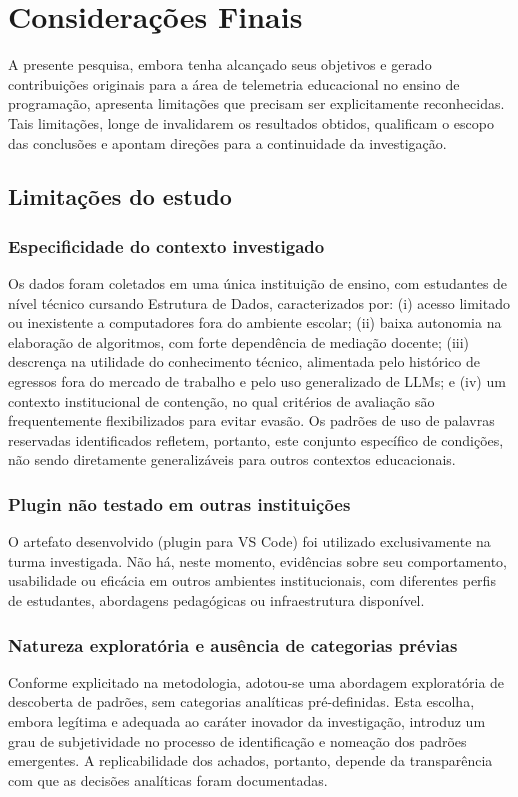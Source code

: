 \chapter{Considerações Finais}
\label{cap-consideracoes-finais}

A presente pesquisa, embora tenha alcançado seus objetivos e gerado contribuições originais para a área de telemetria educacional no ensino de programação, apresenta limitações que precisam ser explicitamente reconhecidas. Tais limitações, longe de invalidarem os resultados obtidos, qualificam o escopo das conclusões e apontam direções para a continuidade da investigação.

\section{Limitações do estudo}


\subsection{Especificidade do contexto investigado}
Os dados foram coletados em uma única instituição de ensino, com estudantes de nível técnico cursando Estrutura de Dados, caracterizados por: (i) acesso limitado ou inexistente a computadores fora do ambiente escolar; (ii) baixa autonomia na elaboração de algoritmos, com forte dependência de mediação docente; (iii) descrença na utilidade do conhecimento técnico, alimentada pelo histórico de egressos fora do mercado de trabalho e pelo uso generalizado de LLMs; e (iv) um contexto institucional de contenção, no qual critérios de avaliação são frequentemente flexibilizados para evitar evasão. Os padrões de uso de palavras reservadas identificados refletem, portanto, este conjunto específico de condições, não sendo diretamente generalizáveis para outros contextos educacionais.

\subsection{Plugin não testado em outras instituições}
O artefato desenvolvido (plugin para VS Code) foi utilizado exclusivamente na turma investigada. Não há, neste momento, evidências sobre seu comportamento, usabilidade ou eficácia em outros ambientes institucionais, com diferentes perfis de estudantes, abordagens pedagógicas ou infraestrutura disponível.

\subsection{Natureza exploratória e ausência de categorias prévias}
Conforme explicitado na metodologia, adotou-se uma abordagem exploratória de descoberta de padrões, sem categorias analíticas pré-definidas. Esta escolha, embora legítima e adequada ao caráter inovador da investigação, introduz um grau de subjetividade no processo de identificação e nomeação dos padrões emergentes. A replicabilidade dos achados, portanto, depende da transparência com que as decisões analíticas foram documentadas.


